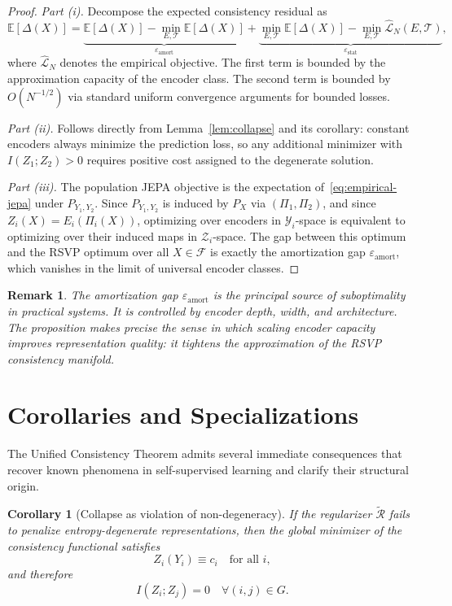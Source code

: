 \documentclass[12pt, oneside]{article}
\newtheorem{corollary}[definition]{Corollary}
\newtheorem{remark}[definition]{Remark}
\begin{document}
\begin{proof}
\textit{Part (i).} Decompose the expected consistency residual as
\[
\mathbb{E}[\Delta(X)] = \underbrace{\mathbb{E}[\Delta(X)] - \min_{E, \mathcal{T}} \mathbb{E}[\Delta(X)]}_{\varepsilon_{\mathrm{amort}}}
+ \underbrace{\min_{E,\mathcal{T}} \mathbb{E}[\Delta(X)] - \min_{E,\mathcal{T}} \hat{\mathcal{L}}_N(E, \mathcal{T})}_{\varepsilon_{\mathrm{stat}}},
\]
where $\hat{\mathcal{L}}_N$ denotes the empirical objective. The first term is bounded by the approximation capacity of the encoder class. The second term is bounded by $O(N^{-1/2})$ via standard uniform convergence arguments for bounded losses.

\textit{Part (ii).} Follows directly from Lemma~\ref{lem:collapse} and its corollary: constant encoders always minimize the prediction loss, so any additional minimizer with $I(Z_1;Z_2)>0$ requires positive cost assigned to the degenerate solution.

\textit{Part (iii).} The population JEPA objective is the expectation of~\eqref{eq:empirical-jepa} under $P_{Y_1, Y_2}$. Since $P_{Y_1, Y_2}$ is induced by $P_X$ via $(\Pi_1, \Pi_2)$, and since $Z_i(X) = E_i(\Pi_i(X))$, optimizing over encoders in $\mathcal{Y}_i$-space is equivalent to optimizing over their induced maps in $\mathcal{Z}_i$-space. The gap between this optimum and the RSVP optimum over all $X \in \mathcal{F}$ is exactly the amortization gap $\varepsilon_{\mathrm{amort}}$, which vanishes in the limit of universal encoder classes.
\end{proof}

\begin{remark}
The amortization gap $\varepsilon_{\mathrm{amort}}$ is the principal source of suboptimality in practical systems. It is controlled by encoder depth, width, and architecture. The proposition makes precise the sense in which scaling encoder capacity improves representation quality: it tightens the approximation of the RSVP consistency manifold.
\end{remark}

\section{Corollaries and Specializations}
\label{sec:corollaries}

The Unified Consistency Theorem admits several immediate consequences that recover known phenomena in self-supervised learning and clarify their structural origin.

\begin{corollary}[Collapse as violation of non-degeneracy]
\label{cor:collapse}
If the regularizer $\widetilde{\mathcal{R}}$ fails to penalize entropy-degenerate representations, then the global minimizer of the consistency functional satisfies
\[
Z_i(Y_i) \equiv c_i \quad \text{for all } i,
\]
and therefore
\[
I(Z_i; Z_j) = 0 \quad \forall (i,j) \in G.
\]
\end{corollary}
\end{document}
